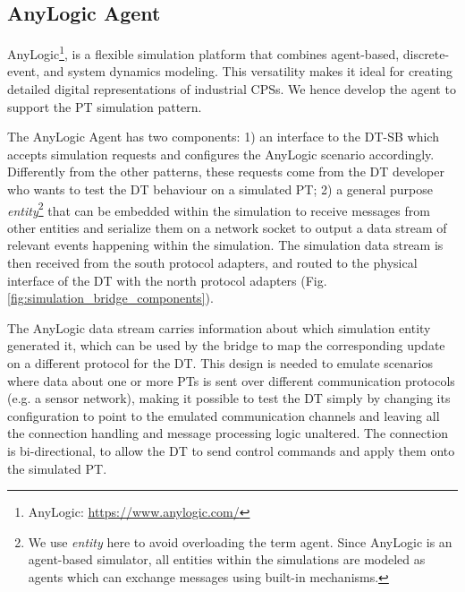 


\subsection{AnyLogic Agent}

AnyLogic\footnote{AnyLogic: \url{https://www.anylogic.com/}}, is a flexible simulation platform that combines agent-based, discrete-event, and system dynamics modeling.
This versatility makes it ideal for creating detailed digital representations of industrial CPSs.
%
We hence develop the agent to support the PT simulation pattern. 

The AnyLogic Agent has two components:
1) an interface to the DT-SB which accepts simulation requests and configures the AnyLogic scenario accordingly. Differently from the other patterns, these requests come from the DT developer who wants to test the DT behaviour on a simulated PT;
2) a general purpose \emph{entity}\footnote{We use \emph{entity} here to avoid overloading the term agent. Since AnyLogic is an agent-based simulator, all entities within the simulations are modeled as agents which can exchange messages using built-in mechanisms.} that can be embedded within the simulation to receive messages from other entities and serialize them on a network socket to output a data stream of relevant events happening within the simulation. The simulation data stream is then received from the south protocol adapters, and routed to the physical interface of the DT with the north protocol adapters (Fig. \ref{fig:simulation_bridge_components}).

The AnyLogic data stream carries information about which simulation entity generated it, which can be used by the bridge to map the corresponding update on a different protocol for the DT.
This design is needed to emulate scenarios where data about one or more PTs is sent over different communication protocols (e.g. a sensor network), making it possible to test the DT simply by changing its configuration to point to the emulated communication channels and leaving all the connection handling and message processing logic unaltered.
The connection is bi-directional, to allow the DT to send control commands and apply them onto the simulated PT.




